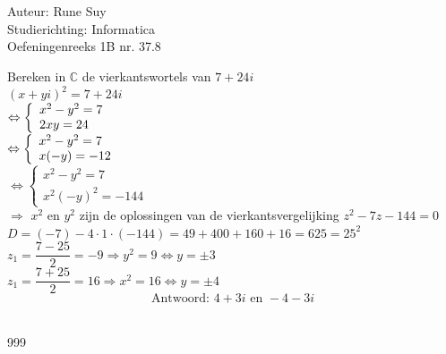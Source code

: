 \documentclass[a4paper]{article}
\begin{document}
\noindent \large Auteur: Rune Suy \\
\noindent \large Studierichting: Informatica\\
\noindent \large Oefeningenreeks 1B nr. 37.8\\

\medskip

\normalsize

Bereken in $\mathbb{C}$ de vierkantswortels van $7+24i$\\

$ (x+yi)^2 = 7+24i $\\

$\Leftrightarrow \left \{ \\
\begin{array}{l} 
    x^2 - y^2 = 7 \\
    2xy = 24 \\
\end{array} \\
\right . $\\

$\Leftrightarrow \left \{ \\
\begin{array}{l} 
    x^2 - y^2 = 7 \\
    x(-y) = -12 \\
\end{array} \\
\right . $\\

$\Leftrightarrow \left \{ 
\begin{array}{l}
    x^2 - y^2 = 7 \\
    x^2(-y)^2 = -144
\end{array}
\right . $\\

$\Rightarrow$ $x^2$ en $y^2$ zijn de oplossingen van de vierkantsvergelijking $z^2 - 7z - 144 = 0$\\

$ D = (-7) - 4\cdot1\cdot(-144) = 49 + 400+160+16 = 625 = 25^2$\\

$ z_1 = \dfrac{7-25}{2} = -9 \Rightarrow y^2 = 9 \Leftrightarrow y = \pm 3$\\

$ z_1 = \dfrac{7+25}{2} = 16 \Rightarrow x^2 = 16 \Leftrightarrow y = \pm 4$\\

$$ \text{Antwoord: } 4+3i \text{ en } -4-3i$$\\

\begin{thebibliography}{999}
\end{thebibliography}
\end{document}
